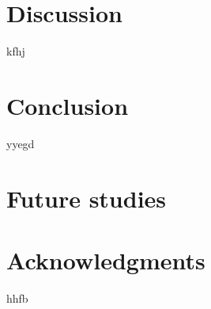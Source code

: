 \documentclass[12pt,a4paper]{article}
\begin{document}
\newpage
\section{Discussion}
kfhj

\newpage
\section{Conclusion}

yyegd

\newpage
\section{Future studies}
\newpage
\section{Acknowledgments}
hhfb




\newpage
\end{document}
